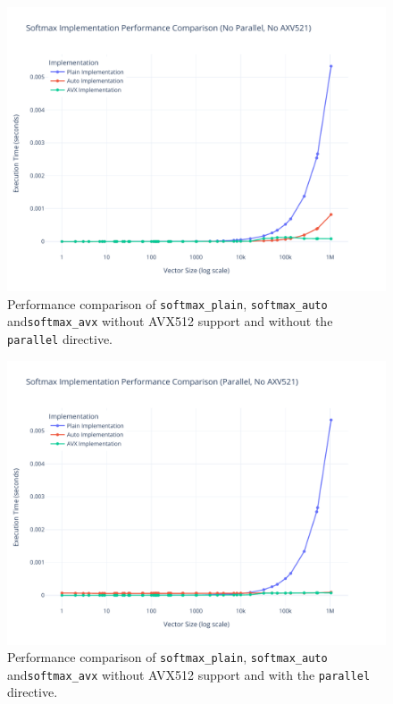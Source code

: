 \documentclass[10pt]{article}
\begin{document}
\begin{figure}[h!]
  \centering
  \includegraphics[width=\textwidth]{../images/softmax_noparallel_noaxv521.pdf}
  \caption{Performance comparison of \texttt{softmax\_plain}, \texttt{softmax\_auto} and\texttt{softmax\_avx} without AVX512 support and without the \texttt{parallel} directive.}
  \label{fig:softmax_auto_no_avx512}
\end{figure}

\begin{figure}[h!]
  \centering
  \includegraphics[width=\textwidth]{../images/softmax_parallel_noaxv521.pdf}
  \caption{Performance comparison of \texttt{softmax\_plain}, \texttt{softmax\_auto} and\texttt{softmax\_avx} without AVX512 support and with the \texttt{parallel} directive.}
  \label{fig:softmax_auto_no_avx512_parallel}
\end{figure}
\end{document}
